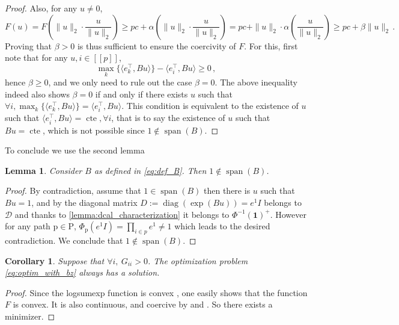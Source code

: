 \documentclass{article}
\theoremstyle{plain}
\newtheorem{lemma}[theorem]{Lemma}
\newtheorem{corollary}[theorem]{Corollary}
\theoremstyle{definition}
\theoremstyle{remark}
\def\Dcal{\mathcal{D}}
\def\diag{\text{diag}}
\def\diag{\operatorname{diag}}
\def\path{{\mathrm{p}}}
\def\pathset{{\mathrm{P}}}
\def\Dcal{{\mathcal{D}}}
\newcommand{\integ}[1]{{[\![#1]\!]}}
\begin{document}
{\begin{proof}
Also, for any $u \neq 0$,
\begin{equation}
F(u) = F\left(\|u\|_2 \cdot \frac{u}{\|u\|_2}\right) \geq pc + \alpha\left(\|u\|_2 \cdot \frac{u}{\|u\|_2}\right) 
= pc + \|u\|_{2} \cdot \alpha\left(\frac{u}{\|u\|_2}\right) \geq pc + \beta \|u\|_2\,.
\end{equation}
Proving that $\beta > 0$ is thus sufficient to ensure the coercivity of $F$.
For this, first note that for any $u, i \in \integ{p}$,
\begin{equation}
\max_{k}\{\langle e_k^\top, B u\rangle\} - \langle e_i^\top, Bu\rangle \geq 0\,,
\end{equation}
hence $\beta \geq 0$, and we only need to rule out the case $\beta=0$. The above inequality indeed also shows $\beta = 0$ if and only if there exists $u$ such that $\forall i, \max_{k}\{\langle e_k^\top, B u\rangle\} = \langle e_i^\top, Bu\rangle$.
This condition is equivalent to the existence of $u$ such that $\langle e_i^\top, Bu\rangle = \operatorname{cte}, \forall i$,  
that is to say the existence of $u$ such that $B u = \operatorname{cte}$, which is not possible since $1 \not\in \operatorname{span}(B)$.
\end{proof}
To conclude we use the second lemma
\begin{lemma}
\label{lemma:notinB}
Consider $B$ as defined in \eqref{eq:def_B}. Then $1 \not\in \operatorname{span}(B)$.
\end{lemma}
\begin{proof}
By contradiction, assume that $1 \in \operatorname{span}(B)$ then there is $u$ such that $Bu = 1$, and by  the diagonal matrix $D := \diag (\exp(Bu)) = e^{1} I$ belongs to $\Dcal$ and thanks to \cref{lemma:dcal_characterization} it belongs to $\Phi^{-1}(\mathbf{1})^+$. However 
for any path $\path \in \pathset$, $\Phi_\path(e^{1}I) = \prod_{i \in p} e^{1}  \neq 1$
which leads to the desired contradiction. We conclude that $1 \not\in \operatorname{span}(B)$.
\end{proof}


\begin{corollary}
\label{lemma:existence_solution}
Suppose that $\forall i, \ G_{ii} > 0$. The optimization problem \eqref{eq:optim_with_bz} always has a solution.
\end{corollary}
\begin{proof}
Since the logsumexp function is convex \citep[Lemma 4]{gao2017properties}, 
one easily shows that the function $F$ is convex. It is also  continuous, and coercive by  and . 
So there exists a minimizer.
\end{proof}

}
\end{document}

